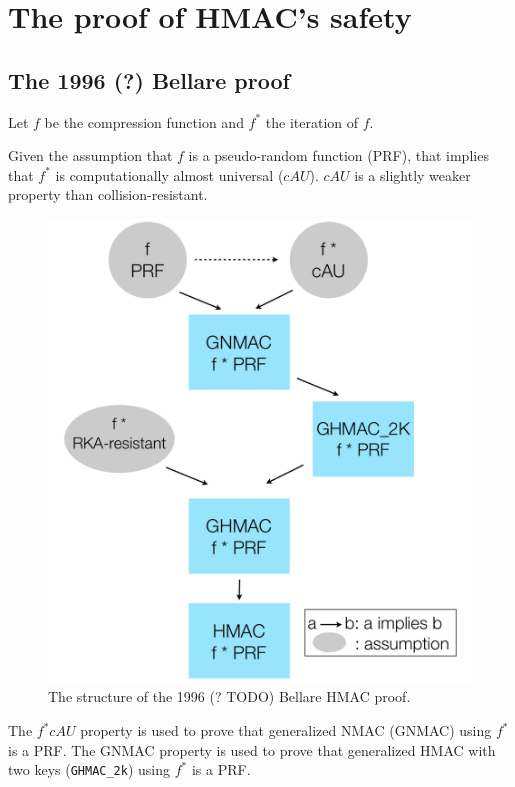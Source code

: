 \documentclass[twocolumn,showpacs,%
  nofootinbib,aps,superscriptaddress,%
  eqsecnum,prd,notitlepage,showkeys,10pt]{revtex4-1}
\begin{document}
\section{The proof of HMAC's safety}

\subsection{The 1996 (?) Bellare proof}

Let $f$ be the compression function and $f^*$ the iteration of $f$.

Given the assumption that $f$ is a pseudo-random function (PRF), that implies that $f^*$ is computationally almost universal ($cAU$). $cAU$ is a slightly weaker property than collision-resistant.

\begin{figure}[h!]
	\centering
	\includegraphics[scale=0.4]{HMAC_proof}
	\caption{The structure of the 1996 (? TODO) Bellare HMAC proof.}
\end{figure}

The $f^* cAU$ property is used to prove that generalized NMAC (GNMAC) using $f^*$ is a PRF. The GNMAC property is used to prove that generalized HMAC with two keys (\verb|GHMAC_2k|) using $f^*$ is a PRF.
\end{document}

